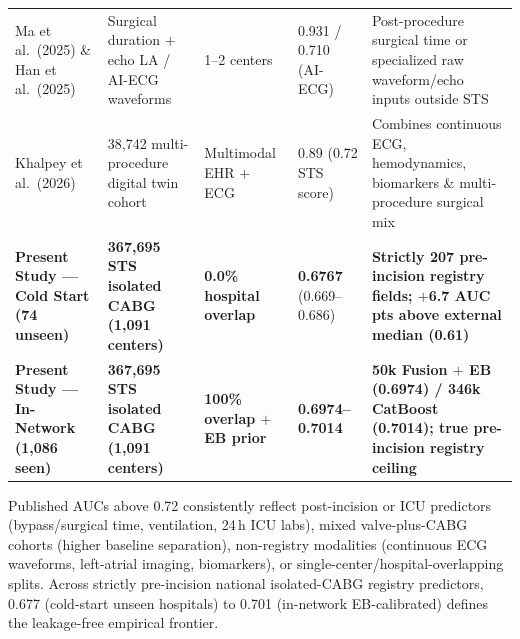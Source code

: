 \begin{table}[t]
\begin{tabularx}{\textwidth}{@{}L{3.25cm}L{3.25cm}L{2.25cm}L{2.35cm}Y@{}}
Ma et al.\ (2025)\cite{ma2025noaf} \& Han et al.\ (2025)\cite{han2025aiecg} & Surgical duration $+$ echo LA / AI-ECG waveforms & 1--2 centers & 0.931 / 0.710 (AI-ECG) & Post-procedure surgical time or specialized raw waveform/echo inputs outside STS \\
Khalpey et al.\ (2026)\cite{khalpey2026digital} & 38,742 multi-procedure digital twin cohort & Multimodal EHR $+$ ECG & 0.89 (0.72 STS score) & Combines continuous ECG, hemodynamics, biomarkers \& multi-procedure surgical mix \\
 \textbf{Present Study --- Cold Start (74 unseen)} & \textbf{367,695 STS isolated CABG (1,091 centers)} & \textbf{0.0\% hospital overlap} & \textbf{0.6767} (0.669--0.686) & \textbf{Strictly 207 pre-incision registry fields; $+$6.7 AUC pts above external median (0.61)} \\
 \textbf{Present Study --- In-Network (1,086 seen)} & \textbf{367,695 STS isolated CABG (1,091 centers)} & \textbf{100\% overlap $+$ EB prior} & \textbf{0.6974--0.7014} & \textbf{50k Fusion $+$ EB (0.6974) / 346k CatBoost (0.7014); true pre-incision registry ceiling} \\
\bottomrule
\end{tabularx}
\par\smallskip\raggedright\fontsize{7.3}{9.1}\selectfont\color{sub}
Published AUCs above 0.72 consistently reflect post-incision or ICU predictors (bypass/surgical time, ventilation, 24\,h ICU labs), mixed valve-plus-CABG cohorts (higher baseline separation), non-registry modalities (continuous ECG waveforms, left-atrial imaging, biomarkers), or single-center/hospital-overlapping splits. Across strictly pre-incision national isolated-CABG registry predictors, 0.677 (cold-start unseen hospitals) to 0.701 (in-network EB-calibrated) defines the leakage-free empirical frontier.
\end{table}
